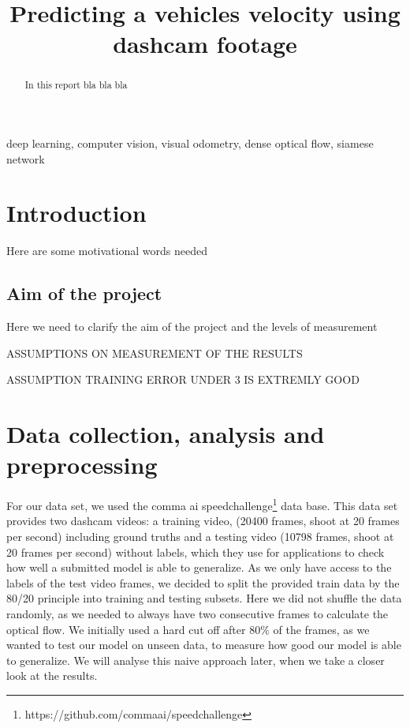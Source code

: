 \documentclass[conference]{IEEEtran}
\begin{document}
\title{Predicting a vehicles velocity using dashcam footage}

\author{
\and
{}
}

\maketitle

\begin{abstract}
In this report bla bla bla
\end{abstract}

\begin{IEEEkeywords}
deep learning, computer vision, visual odometry, dense optical flow, siamese network
\end{IEEEkeywords}

\section{Introduction}
Here are some motivational words needed
\subsection{Aim of the project}
Here we need to clarify the aim of the project and the levels of measurement

ASSUMPTIONS ON MEASUREMENT OF THE RESULTS

ASSUMPTION TRAINING ERROR UNDER 3 IS EXTREMLY GOOD
 

\section{Data collection, analysis and preprocessing}
For our data set, we used the comma ai speedchallenge\footnote{https://github.com/commaai/speedchallenge} data base. This data
set provides two dashcam videos: a training video, (20400 frames, shoot at 20 frames per second) including 
ground truths and a testing video (10798 frames, shoot at 20 frames per second) without labels, which they use for applications 
to check how well a submitted model is able to generalize.
As we only have access to the labels of the test video frames, we decided to split the provided train data by the 80/20 principle into 
training and testing subsets. Here we did not shuffle the data randomly, as we needed to always have two consecutive frames to 
calculate the optical flow. We initially used a hard cut off after 80$\%$ of the frames, as we wanted to test our model on unseen data, 
to measure how good our model is able to generalize. We will analyse this naive approach later, when we take a closer look
at the results.
\end{document}
